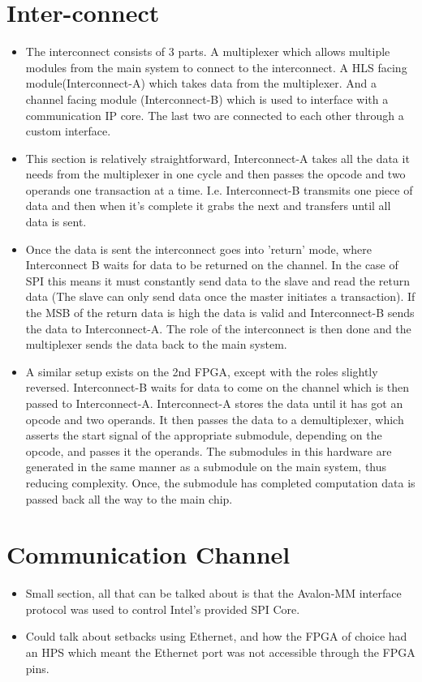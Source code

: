 \section{Inter-connect}

\begin{itemize}
    \item The interconnect consists of 3 parts. A multiplexer which allows multiple modules from the main system to connect to the interconnect. A HLS facing module(Interconnect-A) which takes data from the multiplexer. And a channel facing module (Interconnect-B) which is used to interface with a communication IP core. The last two are connected to each other through a custom interface.
    \item This section is relatively straightforward, Interconnect-A takes all the data it needs from the multiplexer in one cycle and then passes the opcode and two operands one transaction at a time. I.e. Interconnect-B transmits one piece of data and then when it's complete it grabs the next and transfers until all data is sent.
    \item Once the data is sent the interconnect goes into 'return' mode, where Interconnect B waits for data to be returned on the channel. In the case of SPI this means it must constantly send data to the slave and read the return data (The slave can only send data once the master initiates a transaction). If the MSB of the return data is high the data is valid and Interconnect-B sends the data to Interconnect-A. The role of the interconnect is then done and the multiplexer sends the data back to the main system.
    \item A similar setup exists on the 2nd FPGA, except with the roles slightly reversed. Interconnect-B waits for data to come on the channel which is then passed to Interconnect-A. Interconnect-A  stores the data until it has got an opcode and two operands. It then passes the data to a demultiplexer, which asserts the start signal of the appropriate submodule, depending on the opcode, and passes it the operands. The submodules in this hardware are generated in the same manner as a submodule on the main system, thus reducing complexity. Once, the submodule has completed computation data is passed back all the way to the main chip.
\end{itemize}

\section{Communication Channel}

\begin{itemize}
    \item Small section, all that can be talked about is that the Avalon-MM interface protocol was used to control Intel's provided SPI Core.
    \item Could talk about setbacks using Ethernet, and how the FPGA of choice had an HPS which meant the Ethernet port was not accessible through the FPGA pins.
\end{itemize}
